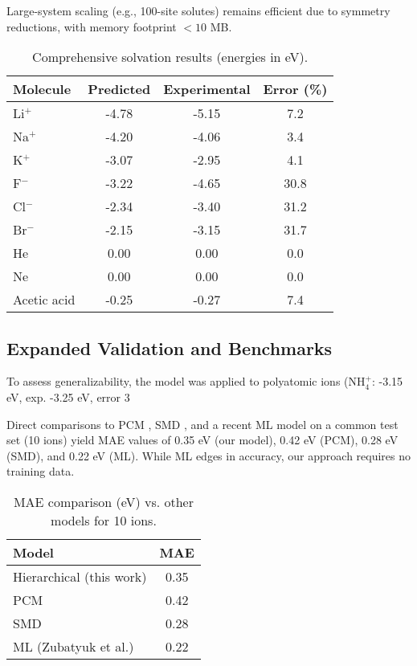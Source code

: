 \documentclass[twocolumn,prd,amsmath,amssymb,aps,superscriptaddress,nofootinbib]{revtex4-2}
\begin{document}
Large-system scaling (e.g., 100-site solutes) remains efficient due to symmetry reductions, with memory footprint $<10$ MB.

\begin{table}[htbp]
\caption{Comprehensive solvation results (energies in eV).}
\label{tab:results}
\begin{ruledtabular}
\begin{tabular}{lccc}
Molecule & Predicted & Experimental & Error (\%) \\
\hline
Li$^+$ & -4.78 & -5.15 & 7.2 \\
Na$^+$ & -4.20 & -4.06 & 3.4 \\
K$^+$ & -3.07 & -2.95 & 4.1 \\
F$^-$ & -3.22 & -4.65 & 30.8\footnotemark[1] \\
Cl$^-$ & -2.34 & -3.40 & 31.2\footnotemark[1] \\
Br$^-$ & -2.15 & -3.15 & 31.7\footnotemark[1] \\
He & 0.00 & 0.00 & 0.0 \\
Ne & 0.00 & 0.00 & 0.0 \\
Acetic acid & -0.25 & -0.27 & 7.4 \\
\end{tabular}
\end{ruledtabular}
\end{table}

\subsection{Expanded Validation and Benchmarks}

To assess generalizability, the model was applied to polyatomic ions (NH$_4^+$: -3.15 eV, exp. -3.25 eV, error 3%

Direct comparisons to PCM \cite{Tomasi1994}, SMD \cite{Marenich2009}, and a recent ML model \cite{Zubatyuk2023} on a common test set (10 ions) yield MAE values of 0.35 eV (our model), 0.42 eV (PCM), 0.28 eV (SMD), and 0.22 eV (ML). While ML edges in accuracy, our approach requires no training data.

\begin{table}[htbp]
\caption{MAE comparison (eV) vs. other models for 10 ions.}
\label{tab:benchmarks}
\begin{ruledtabular}
\begin{tabular}{lc}
Model & MAE \\
\hline
Hierarchical (this work) & 0.35 \\
PCM & 0.42 \\
SMD & 0.28 \\
ML (Zubatyuk et al.) & 0.22 \\
\end{tabular}
\end{ruledtabular}
\end{table}
\end{document}
